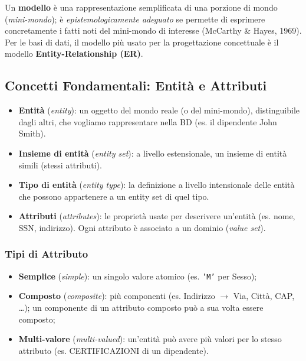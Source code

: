 \documentclass[12pt, a4paper]{article}
\begin{document}
Un \textbf{modello} è una rappresentazione semplificata di una porzione di mondo (\textit{mini-mondo}); è \textit{epistemologicamente adeguato} se permette di esprimere concretamente i fatti noti del mini-mondo di interesse (McCarthy \& Hayes, 1969). Per le basi di dati, il modello più usato per la progettazione concettuale è il modello \textcolor{tocsec}{\textbf{Entity-Relationship (ER)}}.

\subsection{Concetti Fondamentali: Entità e Attributi}

\begin{itemize}
    \item \textbf{Entità} (\textit{entity}): un oggetto del mondo reale (o del mini-mondo), distinguibile dagli altri, che vogliamo rappresentare nella BD (es. il dipendente John Smith).
    \item \textbf{Insieme di entità} (\textit{entity set}): a livello estensionale, un insieme di entità simili (stessi attributi).
    \item \textbf{Tipo di entità} (\textit{entity type}): la definizione a livello intensionale delle entità che possono appartenere a un entity set di quel tipo.
    \item \textbf{Attributi} (\textit{attributes}): le proprietà usate per descrivere un'entità (es. nome, SSN, indirizzo). Ogni attributo è associato a un dominio (\textit{value set}).
\end{itemize}

\subsubsection{Tipi di Attributo}
\begin{itemize}
    \item \textbf{Semplice} (\textit{simple}): un singolo valore atomico (es. \texttt{'M'} per Sesso);
    \item \textbf{Composto} (\textit{composite}): più componenti (es. Indirizzo $\to$ Via, Città, CAP, \ldots); un componente di un attributo composto può a sua volta essere composto;
    \item \textbf{Multi-valore} (\textit{multi-valued}): un'entità può avere più valori per lo stesso attributo (es. CERTIFICAZIONI di un dipendente).
\end{itemize}
\end{document}
